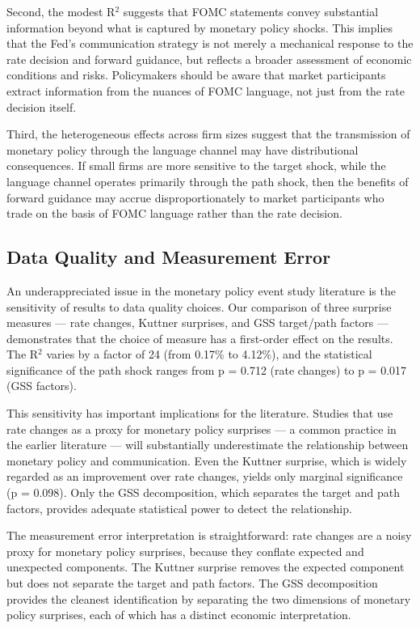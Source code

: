 \documentclass[12pt]{article}
\begin{document}
Second, the modest R$^2$ suggests that FOMC statements convey substantial information beyond what is captured by monetary policy shocks. This implies that the Fed's communication strategy is not merely a mechanical response to the rate decision and forward guidance, but reflects a broader assessment of economic conditions and risks. Policymakers should be aware that market participants extract information from the nuances of FOMC language, not just from the rate decision itself.

Third, the heterogeneous effects across firm sizes suggest that the transmission of monetary policy through the language channel may have distributional consequences. If small firms are more sensitive to the target shock, while the language channel operates primarily through the path shock, then the benefits of forward guidance may accrue disproportionately to market participants who trade on the basis of FOMC language rather than the rate decision.

\subsection{Data Quality and Measurement Error}

An underappreciated issue in the monetary policy event study literature is the sensitivity of results to data quality choices. Our comparison of three surprise measures --- rate changes, Kuttner surprises, and GSS target/path factors --- demonstrates that the choice of measure has a first-order effect on the results. The R$^2$ varies by a factor of 24 (from 0.17\% to 4.12\%), and the statistical significance of the path shock ranges from p = 0.712 (rate changes) to p = 0.017 (GSS factors).

This sensitivity has important implications for the literature. Studies that use rate changes as a proxy for monetary policy surprises --- a common practice in the earlier literature --- will substantially underestimate the relationship between monetary policy and communication. Even the Kuttner surprise, which is widely regarded as an improvement over rate changes, yields only marginal significance (p = 0.098). Only the GSS decomposition, which separates the target and path factors, provides adequate statistical power to detect the relationship.

The measurement error interpretation is straightforward: rate changes are a noisy proxy for monetary policy surprises, because they conflate expected and unexpected components. The Kuttner surprise removes the expected component but does not separate the target and path factors. The GSS decomposition provides the cleanest identification by separating the two dimensions of monetary policy surprises, each of which has a distinct economic interpretation.
\end{document}
